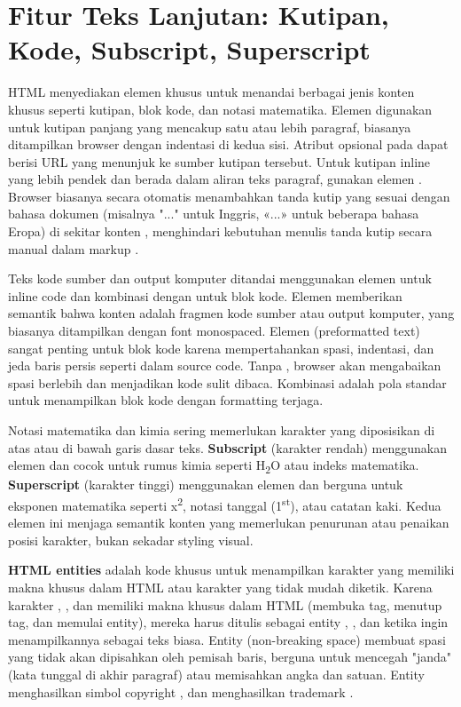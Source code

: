 \section{Fitur Teks Lanjutan: Kutipan, Kode, Subscript, Superscript}

HTML menyediakan elemen khusus untuk menandai berbagai jenis konten khusus seperti kutipan, blok kode, dan notasi matematika. Elemen  digunakan untuk kutipan panjang yang mencakup satu atau lebih paragraf, biasanya ditampilkan browser dengan indentasi di kedua sisi. Atribut opsional  pada  dapat berisi URL yang menunjuk ke sumber kutipan tersebut. Untuk kutipan inline yang lebih pendek dan berada dalam aliran teks paragraf, gunakan elemen . Browser biasanya secara otomatis menambahkan tanda kutip yang sesuai dengan bahasa dokumen (misalnya "..." untuk Inggris, «...» untuk beberapa bahasa Eropa) di sekitar konten , menghindari kebutuhan menulis tanda kutip secara manual dalam markup \cite{mdnHtmlIntro}.

Teks kode sumber dan output komputer ditandai menggunakan elemen  untuk inline code dan kombinasi  dengan  untuk blok kode. Elemen  memberikan semantik bahwa konten adalah fragmen kode sumber atau output komputer, yang biasanya ditampilkan dengan font monospaced. Elemen  (preformatted text) sangat penting untuk blok kode karena mempertahankan spasi, indentasi, dan jeda baris persis seperti dalam source code. Tanpa , browser akan mengabaikan spasi berlebih dan menjadikan kode sulit dibaca. Kombinasi  adalah pola standar untuk menampilkan blok kode dengan formatting terjaga.

Notasi matematika dan kimia sering memerlukan karakter yang diposisikan di atas atau di bawah garis dasar teks. \textbf{Subscript} (karakter rendah) menggunakan elemen  dan cocok untuk rumus kimia seperti H\textsubscript{2}O atau indeks matematika. \textbf{Superscript} (karakter tinggi) menggunakan elemen  dan berguna untuk eksponen matematika seperti x\textsuperscript{2}, notasi tanggal (1\textsuperscript{st}), atau catatan kaki. Kedua elemen ini menjaga semantik konten yang memerlukan penurunan atau penaikan posisi karakter, bukan sekadar styling visual.

\textbf{HTML entities} adalah kode khusus untuk menampilkan karakter yang memiliki makna khusus dalam HTML atau karakter yang tidak mudah diketik. Karena karakter \code{<}, \code{>}, dan  memiliki makna khusus dalam HTML (membuka tag, menutup tag, dan memulai entity), mereka harus ditulis sebagai entity , , dan  ketika ingin menampilkannya sebagai teks biasa. Entity  (non-breaking space) membuat spasi yang tidak akan dipisahkan oleh pemisah baris, berguna untuk mencegah "janda" (kata tunggal di akhir paragraf) atau memisahkan angka dan satuan. Entity  menghasilkan simbol copyright \textcopyright, dan  menghasilkan trademark \textregistered.

